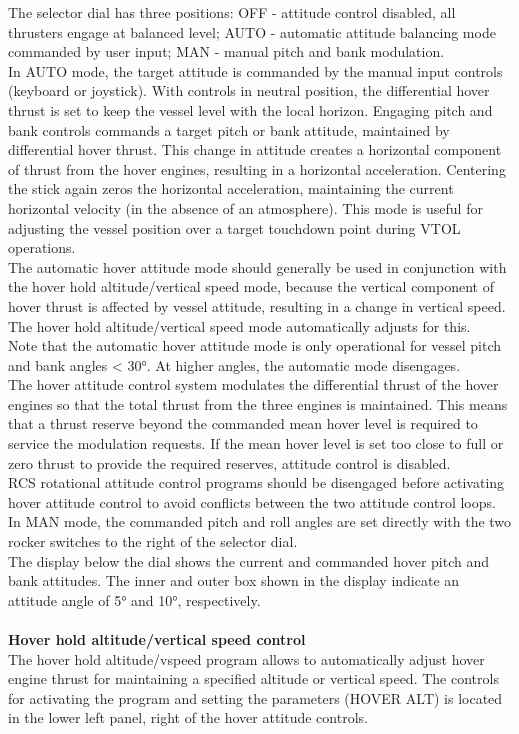 \documentclass[Orbiter User Manual.tex]{subfiles}
\begin{document}
\noindent
The selector dial has three positions: OFF - attitude control disabled, all thrusters engage at balanced level; AUTO - automatic attitude balancing mode commanded by user input; MAN - manual pitch and bank modulation.\\
In AUTO mode, the target attitude is commanded by the manual input controls (keyboard or joystick). With controls in neutral position, the differential hover thrust is set to keep the vessel level with the local horizon. Engaging pitch and bank controls commands a target pitch or bank attitude, maintained by differential hover thrust. This change in attitude creates a horizontal component of thrust from the hover engines, resulting in a horizontal acceleration. Centering the stick again zeros the horizontal acceleration, maintaining the current horizontal velocity (in the absence of an atmosphere). This mode is useful for adjusting the vessel position over a target touchdown point during VTOL operations.\\
The automatic hover attitude mode should generally be used in conjunction with the hover hold altitude/vertical speed mode, because the vertical component of hover thrust is affected by vessel attitude, resulting in a change in vertical speed. The hover hold altitude/vertical speed mode automatically adjusts for this.\\
Note that the automatic hover attitude mode is only operational for vessel pitch and bank angles < 30°. At higher angles, the automatic mode disengages.\\
The hover attitude control system modulates the differential thrust of the hover engines so that the total thrust from the three engines is maintained. This means that a thrust reserve beyond the commanded mean hover level is required to service the modulation requests. If the mean hover level is set too close to full or zero thrust to provide the required reserves, attitude control is disabled.\\
RCS rotational attitude control programs should be disengaged before activating hover attitude control to avoid conflicts between the two attitude control loops.\\
In MAN mode, the commanded pitch and roll angles are set directly with the two rocker switches to the right of the selector dial.\\
The display below the dial shows the current and commanded hover pitch and bank attitudes. The inner and outer box shown in the display indicate an attitude angle of 5° and 10°, respectively.\\
\\
\textbf{Hover hold altitude/vertical speed control}\\
The hover hold altitude/vspeed program allows to automatically adjust hover engine thrust for maintaining a specified altitude or vertical speed. The controls for activating the program and setting the parameters (HOVER ALT) is located in the lower left panel, right of the hover attitude controls.
\end{document}

